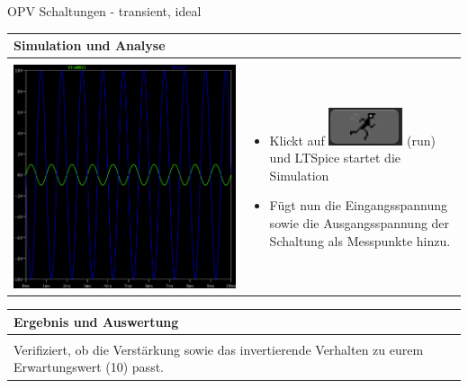 \begin{frame}[t]{OPV Schaltungen - transient, ideal}
\begin{spacing}{0.9}
\begin{tiny}
\begin{table}[h!]
\begin{tabular}{p{4cm} p{6cm}}
          \textbf{Simulation und Analyse} & \\
          \hline \\
          \begin{minipage}{.5\textwidth}
            \includegraphics[width=0.5\linewidth]{pictures/analysis_5.png}
          \end{minipage} 
          & 
          \begin{minipage}{.5\textwidth}
          \begin{itemize}
            \item Klickt auf \includegraphics[scale=0.3]{pictures/run.png} (run) und LTSpice startet die Simulation
            \item Fügt nun die Eingangsspannung sowie die Ausgangsspannung der Schaltung als Messpunkte hinzu.
          \end{itemize}
          \end{minipage} 
          \\
        \end{tabular}
      \end{table}
    \end{tiny} \end{spacing}
    
      \begin{spacing}{0.9} \begin{tiny}
        \begin{table}[h!]
          \begin{tabular}{p{10cm} }
            \hline
            \textbf{Ergebnis und Auswertung} \\
            \hline \\    
            Verifiziert, ob die Verstärkung sowie das invertierende Verhalten zu eurem Erwartungswert (10) passt. 
          \end{tabular}
        \end{table}
      \end{tiny} \end{spacing}
      
       \end{frame}


